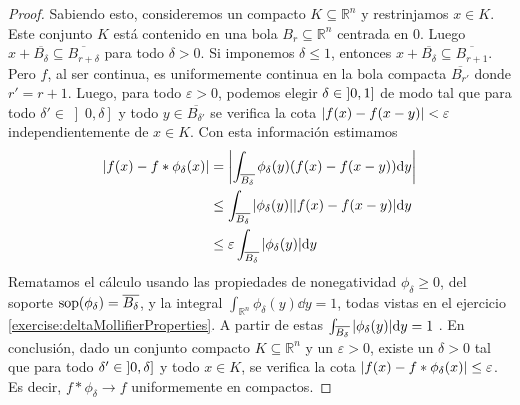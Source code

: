 \documentclass{article}
\newcommand{\realNumbers}{\mathbb{R}}
\DeclareMathOperator{\support}{\textnormal{sop}}
\newcommand{\leftOpenInterval}{\left]}
\newcommand{\rightOpenInterval}{\right[}
\newcommand{\leftClosedInterval}{\left[}
\newcommand{\rightClosedInterval}{\right]}
\newcommand{\interval}[3]{%
  \ifstrequal{#1}{oo}{%
    \leftOpenInterval #2, #3 \rightOpenInterval%
  }{%
    \ifstrequal{#1}{co}{%
      \leftClosedInterval #2, #3 \rightOpenInterval%
    }{%
      \ifstrequal{#1}{oc}{
        \leftOpenInterval #2, #3 \rightClosedInterval%
      }{%
        \ifstrequal{#1}{cc}{
          \leftClosedInterval #2, #3 \rightClosedInterval
        }{%
        }%
      }%
    }%
  }%
}
\theoremstyle{remark}
\begin{document}
\begin{proof}
    Sabiendo esto, consideremos un compacto \(K \subseteq \realNumbers^n\) y restrinjamos \(x \in K\).
    Este conjunto \(K\) está contenido en una bola \(B_r \subseteq \realNumbers^n\) centrada en 0.
    Luego \(x + \overline{B_{\delta}} \subseteq \overline{B_{r + \delta}}\) para todo \(\delta > 0\).
    Si imponemos \(\delta \leq 1\), entonces \(x + \overline{B_{\delta}} \subseteq \overline{B_{r + 1}}\).
    Pero \(f\), al ser continua, es uniformemente continua en la bola compacta \(\overline{B_{r'}}\) donde \(r' = r + 1\).
    Luego, para todo \(\varepsilon > 0\), podemos elegir \(\delta \in \interval{oc}{0}{1}\) de modo tal que para todo \(\delta' \in \left]0, \delta \right]\) y todo \(y \in \overline{B_{\delta'}}\) se verifica la cota \(\abs{f(x) - f(x - y)} < \varepsilon\) independientemente de \(x \in K\).
    Con esta información estimamos
    \begin{align}
      \abs{
        f(x) - f * \phi_{\delta} (x)
      }
      &=
      \abs{
        \int_{\overline{B_{\delta}}} 
          \phi_{\delta}(y) (f(x) - f(x - y)) 
        \dd y
      }
      \\
      &\leq
      \int_{\overline{B_{\delta}}}
        \abs{\phi_{\delta}(y)} \abs{f(x) - f(x - y)}
      \dd y
      \\
      &\leq
      \varepsilon
      \int_{\overline{B_{\delta}}}
        \abs{\phi_{\delta}(y)}
      \dd y
    \end{align}
    Rematamos el cálculo usando las propiedades de nonegatividad \(\phi_{\delta} \geq 0\), del soporte \(\support(\phi_{\delta}) = \overline{B_{\delta}}\), y la integral \(\int_{\realNumbers^n} \phi_{\delta}(y) \dd y = 1\), todas vistas en el ejercicio \ref{exercise:deltaMollifierProperties}.
    A partir de estas 
    \(
      \int_{\overline{B_{\delta}}}
        \abs{\phi_{\delta}(y)}
      \dd y
      =
      1
    \)
    .
    En conclusión, dado un conjunto compacto \(K \subseteq \realNumbers^n\) y un \(\varepsilon > 0\), existe un \(\delta > 0\) tal que para todo \(\delta' \in \interval{oc}{0}{\delta}\) y todo \(x \in K\), se verifica la cota \(\abs{f(x) - f * \phi_{\delta}(x)} \leq \varepsilon\).
    Es decir, \(f * \phi_{\delta} \rightarrow f\) uniformemente en compactos.
  \end{proof}

\end{document}
